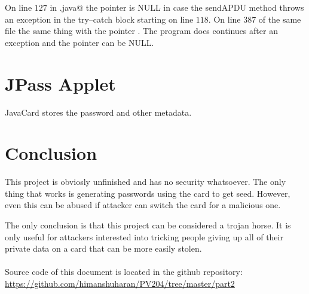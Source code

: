 \documentclass[paper=a4, fontsize=12pt]{scrartcl}
\begin{document}
On line $127$ in \verb@CardInterface.java@ the pointer \verb@response@ is NULL in case the sendAPDU method throws an exception in the try--catch block starting on line $118$.
On line $387$ of the same file the same thing with the pointer \verb@encrypted@. The program does continues after an exception and the pointer can be NULL.

\section{JPass Applet}
JavaCard stores the password and other metadata.%

\section{Conclusion}
This project is obviosly unfinished and has no security whatsoever.
The only thing that works is generating passwords using the card to get seed.
However, even this can be abused if attacker can switch the card for a malicious one.

The only conclusion is that this project can be considered a trojan horse.
It is only useful for attackers interested into tricking people giving up all of their private data on a card that can be more easily stolen.
\\
\\
Source code of this document is located in the github repository:
\\ \url{https://github.com/himanshuharan/PV204/tree/master/part2}
\end{document}

